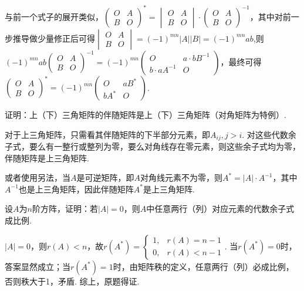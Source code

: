 \begin{exercise}
\begin{exgroup}
\begin{answer}
            与前一个式子的展开类似，$\begin{pmatrix}
                    O & A \\ B & O
                \end{pmatrix}^*=\begin{vmatrix}
                    O & A \\ B & O
                \end{vmatrix}\cdot \begin{pmatrix}
                    O & A \\ B & O
                \end{pmatrix}^{-1}$，其中对前一步推导做少量修正后可得$\begin{vmatrix}
                    O & A \\ B & O
                \end{vmatrix}=(-1)^{mn}|A||B|=(-1)^{mn}ab$,则$(-1)^{mn}ab\begin{pmatrix}
                    O & A \\ B & O
                \end{pmatrix}^{-1}=(-1)^{mn}\begin{pmatrix}
                    O & a\cdot bB^{-1} \\ b\cdot aA^{-1} & O
                \end{pmatrix}$，最终可得$\begin{pmatrix}
                    O & A \\ B & O
                \end{pmatrix}^*=(-1)^{mn}\begin{pmatrix}
                    O & aB^* \\ bA^* & O
                \end{pmatrix}$.
        \end{answer}

        \item 证明：上（下）三角矩阵的伴随矩阵是上（下）三角矩阵（对角矩阵为特例）.
        \begin{answer}
            对于上三角矩阵，只需看其伴随矩阵的下半部分元素，即$A_{ij},j>i$. 对这些代数余子式，要么有一整行或整列为零，要么对角线存在零元素，则这些余子式均为零，伴随矩阵是上三角矩阵.\par 或者使用另法，当$A$是可逆矩阵，即$A$对角线元素不为零，则$A^*=|A|\cdot A^{-1}$，其中$A^{-1}$也是上三角矩阵，因此伴随矩阵$A^*$是上三角矩阵.
        \end{answer}

        \item 设$A$为$n$阶方阵，证明：若$|A|=0$，则$A$中任意两行（列）对应元素的代数余子式成比例.
        \begin{answer}
            $|A|=0$，则$r(A)<n$，故$r(A^*)=\begin{cases}
                1, & r(A)=n-1 \\
                0, & r(A)<n-1
            \end{cases}$. 当$r(A^*)=0$时，答案显然成立；当$r(A^*)=1$时，由矩阵秩的定义，任意两行（列）必成比例，否则秩大于1，矛盾. 综上，原题得证.
        \end{answer}


\end{exgroup}
\end{exercise}
